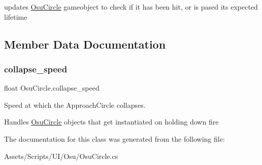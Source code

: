 updates \hyperlink{class_osu_circle}{Osu\+Circle} gameobject to check if it has been hit, or is pased its expected lifetime 

\subsection{Member Data Documentation}
\mbox{\label{class_osu_circle_aaf07a385b1c32a713145d07dbaf9c5d0}} 
\subsubsection{\texorpdfstring{collapse\+\_\+speed}{collapse\_speed}}
{\footnotesize\ttfamily float Osu\+Circle.\+collapse\+\_\+speed}



Speed at which the Approach\+Circle collapses. 

Handles \hyperlink{class_osu_circle}{Osu\+Circle} objects that get instantiated on holding down fire 

The documentation for this class was generated from the following file\+:\begin{DoxyCompactItemize}
\item 
Assets/\+Scripts/\+U\+I/\+Osu/Osu\+Circle.\+cs\end{DoxyCompactItemize}
